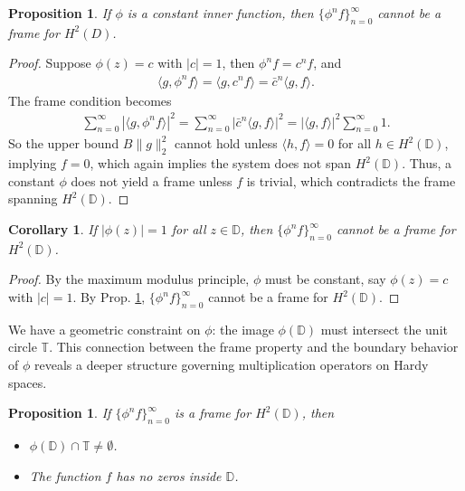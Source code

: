 \documentclass[12pt,titlepage]{amsart}
\newtheorem{cor}[thm]{Corollary}
\newtheorem{prop}[thm]{Proposition}
\theoremstyle{definition}
\theoremstyle{remark}
\begin{document}
\begin{prop} \label{Prop.3}
If $\phi$ is a constant inner function, then $\{\phi^n f
\}_{n=0}^\infty $ cannot be a frame for $H^2(D)$.
\end{prop}
\begin{proof}
Suppose $\phi(z) = c$ with $|c| = 1$, then $\phi^n f = c^n f$, and
\begin{eqnarray*}
\langle g, \phi^n f \rangle = \langle g, c^n f \rangle = \bar{c}^n
\langle g, f \rangle.
\end{eqnarray*}
The frame condition becomes
\begin{eqnarray*}
\sum_{n=0}^\infty |\langle g, \phi^n f \rangle|^2 =
\sum_{n=0}^\infty |\bar{c}^n \langle g, f \rangle|^2 = |\langle g,
f \rangle|^2 \sum_{n=0}^\infty 1.
\end{eqnarray*}
So the upper bound $B\|g\|_2^2$ cannot hold unless $\langle h, f
\rangle = 0$ for all $h\in H^2(\mathbb{D})$, implying $f=0$, which
again implies the system does not span $H^2(\mathbb{D})$. Thus, a
constant $\phi$ does not yield a frame unless $f$ is trivial,
which contradicts the frame spanning $H^2(\mathbb{D})$.
\end{proof}
\begin{cor}
If $|\phi(z)| = 1$ for all $z \in \mathbb{D}$, then $\{\phi^n f
\}_{n=0}^\infty $ cannot be a frame for $H^2(\mathbb{D})$.
\end{cor}
\begin{proof}
By the maximum modulus principle, $\phi$ must be constant, say
$\phi(z) = c$ with $|c| = 1$. By Prop. \ref{Prop.3}, $\{\phi^n f
\}_{n=0}^\infty$ cannot be a frame for $H^2(\mathbb{D})$.
\end{proof}
We have a geometric constraint on $\phi$: the image
$\phi(\mathbb{D})$ must intersect the unit circle $\mathbb{T}$.
This connection between the frame property and the boundary
behavior of $\phi$ reveals a deeper structure governing
multiplication operators on Hardy spaces.
\begin{prop} \label{Prop.4}
If $\{\phi^n f\}_{n=0}^\infty$ is a frame for $H^2(\mathbb{D})$,
then
\begin{itemize}
\item[(i)] $\phi(\mathbb{D})\cap \mathbb{T}\neq \emptyset$.
\item[(ii)] The function $f$ has no zeros inside $\mathbb{D}$.
\end{itemize}
\end{prop}
\end{document}
